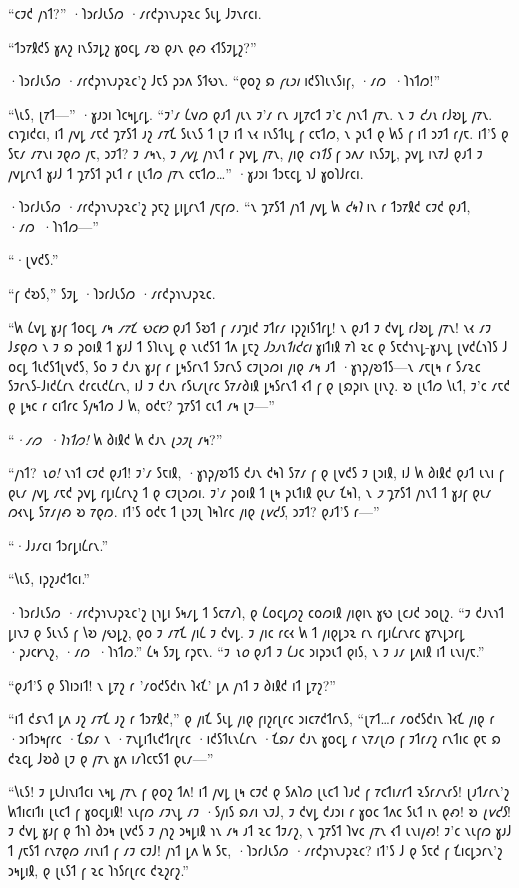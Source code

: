 “𐑤𐑲𐑒 𐑢𐑪𐑑?” ·𐑐𐑮𐑩𐑓𐑧𐑕𐑼 ·𐑥𐑩𐑒𐑜𐑪𐑯𐑨𐑜𐑷𐑤 𐑕𐑧𐑛 𐑓𐑲𐑯𐑩𐑤𐑦.

“𐑑𐑮𐑳𐑙𐑒𐑕 𐑣𐑵𐑟 𐑦𐑯𐑕𐑲𐑛𐑟 𐑣𐑴𐑤𐑛 𐑥𐑹 𐑞𐑨𐑯 𐑞𐑺 𐑬𐑑𐑕𐑲𐑛𐑟?”

·𐑐𐑮𐑩𐑓𐑧𐑕𐑼 ·𐑥𐑩𐑒𐑜𐑪𐑯𐑨𐑜𐑷𐑤'𐑟 𐑓𐑱𐑕 𐑜𐑮𐑵 𐑕𐑑𐑻𐑯. “𐑞𐑴𐑟 𐑸 \emph{𐑝𐑧𐑮𐑦} 𐑦𐑒𐑕𐑐𐑧𐑯𐑕𐑦𐑝, ·𐑥𐑼~·𐑐𐑪𐑑𐑼!”

“𐑘𐑧𐑕, 𐑚𐑳𐑑—” ·𐑣𐑨𐑮𐑦 𐑐𐑤𐑰𐑛𐑩𐑛. “𐑲'𐑥 𐑖𐑫𐑼 𐑞𐑨𐑑 𐑢𐑧𐑯 𐑲'𐑥 𐑩𐑯 𐑨𐑛𐑳𐑤𐑑 𐑲'𐑤 𐑢𐑪𐑯𐑑 𐑢𐑳𐑯. 𐑯 𐑲 \emph{𐑒𐑨𐑯} 𐑩𐑓𐑹𐑛 𐑢𐑳𐑯. 𐑤𐑪𐑡𐑦𐑒𐑤𐑦, 𐑦𐑑 𐑢𐑫𐑛 𐑥𐑱𐑒 𐑡𐑳𐑕𐑑 𐑨𐑟 𐑥𐑳𐑗 𐑕𐑧𐑯𐑕 𐑑 𐑚𐑲 𐑦𐑑 𐑯𐑬 𐑦𐑯𐑕𐑑𐑧𐑛 𐑝 𐑤𐑱𐑑𐑼, 𐑯 𐑜𐑧𐑑 𐑞 𐑿𐑕 𐑝 𐑦𐑑 𐑮𐑲𐑑 𐑩𐑢𐑱. 𐑦𐑑'𐑕 𐑞 𐑕𐑱𐑥 𐑥𐑳𐑯𐑦 𐑲𐑞𐑼 𐑢𐑱, 𐑮𐑲𐑑? 𐑲 𐑥𐑰𐑯, 𐑲 \emph{𐑢𐑫𐑛} 𐑢𐑪𐑯𐑑 𐑩 𐑜𐑫𐑛 𐑢𐑳𐑯, 𐑢𐑦𐑞 \emph{𐑤𐑪𐑑𐑕} 𐑝 𐑮𐑵𐑥 𐑦𐑯𐑕𐑲𐑛, 𐑜𐑫𐑛 𐑦𐑯𐑳𐑓 𐑞𐑨𐑑 𐑲 𐑢𐑫𐑛𐑩𐑯𐑑 𐑣𐑨𐑓 𐑑 𐑡𐑳𐑕𐑑 𐑜𐑧𐑑 𐑩 𐑚𐑧𐑑𐑼 𐑢𐑳𐑯 𐑤𐑱𐑑𐑼…” ·𐑣𐑨𐑮𐑦 𐑑𐑮𐑱𐑤𐑛 𐑪𐑓 𐑣𐑴𐑐𐑓𐑩𐑤𐑦.

·𐑐𐑮𐑩𐑓𐑧𐑕𐑼 ·𐑥𐑩𐑒𐑜𐑪𐑯𐑨𐑜𐑷𐑤'𐑟 𐑜𐑱𐑟 𐑛𐑦𐑛𐑩𐑯𐑑 𐑢𐑱𐑝𐑼. “𐑯 𐑡𐑳𐑕𐑑 𐑢𐑪𐑑 𐑢𐑫𐑛 𐑿 \emph{𐑒𐑰𐑐} 𐑦𐑯 𐑩 𐑑𐑮𐑳𐑙𐑒 𐑤𐑲𐑒 𐑞𐑨𐑑, ·𐑥𐑼~·𐑐𐑪𐑑𐑼—”

“·𐑚𐑫𐑒𐑕.”

“𐑝 𐑒𐑹𐑕,” 𐑕𐑲𐑛 ·𐑐𐑮𐑩𐑓𐑧𐑕𐑼 ·𐑥𐑩𐑒𐑜𐑪𐑯𐑨𐑜𐑷𐑤.

“𐑿 𐑖𐑫𐑛 𐑣𐑨𐑝 𐑑𐑴𐑤𐑛 𐑥𐑰 \emph{𐑥𐑳𐑗 𐑻𐑤𐑽} 𐑞𐑨𐑑 𐑕𐑹𐑑 𐑝 𐑥𐑨𐑡𐑦𐑒 𐑲𐑑𐑩𐑥 𐑦𐑜𐑟𐑦𐑕𐑑𐑩𐑛! 𐑯 𐑞𐑨𐑑 𐑲 𐑒𐑫𐑛 𐑩𐑓𐑹𐑛 𐑢𐑳𐑯! 𐑯𐑬 𐑥𐑲 𐑓𐑭𐑞𐑼 𐑯 𐑲 𐑸 𐑜𐑴𐑦𐑙 𐑑 𐑣𐑨𐑓 𐑑 𐑕𐑐𐑧𐑯𐑛 𐑞 𐑯𐑧𐑒𐑕𐑑 𐑑𐑵 𐑛𐑱𐑟 \emph{𐑓𐑮𐑨𐑯𐑑𐑦𐑒𐑤𐑦} 𐑣𐑦𐑑𐑦𐑙 𐑳𐑐 𐑷𐑤 𐑞 𐑕𐑱𐑒𐑪𐑯𐑛-𐑣𐑨𐑯𐑛 𐑚𐑫𐑒𐑖𐑪𐑐𐑕 𐑓 𐑴𐑤𐑛 𐑑𐑧𐑒𐑕𐑑𐑚𐑫𐑒𐑕, 𐑕𐑴 𐑲 𐑒𐑨𐑯 𐑣𐑨𐑝 𐑩 𐑛𐑰𐑕𐑩𐑯𐑑 𐑕𐑲𐑩𐑯𐑕 𐑤𐑲𐑚𐑮𐑼𐑦 𐑢𐑦𐑞 𐑥𐑰 𐑨𐑑 ·𐑣𐑪𐑜𐑢𐑹𐑑𐑕—𐑯 𐑥𐑱𐑚𐑰 𐑩 𐑕𐑥𐑷𐑤 𐑕𐑲𐑩𐑯𐑕-𐑓𐑦𐑒𐑖𐑩𐑯 𐑒𐑩𐑤𐑧𐑒𐑖𐑩𐑯, 𐑦𐑓 𐑲 𐑒𐑨𐑯 𐑩𐑕𐑧𐑥𐑚𐑩𐑤 𐑕𐑳𐑥𐑔𐑦𐑙 𐑛𐑰𐑕𐑩𐑯𐑑 𐑬𐑑 𐑝 𐑞 𐑚𐑸𐑜𐑦𐑯 𐑚𐑦𐑯𐑟. 𐑹 𐑚𐑧𐑑𐑼 𐑘𐑧𐑑, 𐑲'𐑤 𐑥𐑱𐑒 𐑞 𐑛𐑰𐑤 𐑩 𐑤𐑦𐑑𐑩𐑤 𐑕𐑢𐑰𐑑𐑼 𐑓 𐑿, 𐑴𐑒𐑱? 𐑡𐑳𐑕𐑑 𐑤𐑧𐑑 𐑥𐑰 𐑚𐑲—”

“\emph{·𐑥𐑼~·𐑐𐑪𐑑𐑼!} 𐑿 𐑔𐑦𐑙𐑒 𐑿 𐑒𐑨𐑯 \emph{𐑚𐑮𐑲𐑚} 𐑥𐑰?”

“𐑢𐑪𐑑? \emph{𐑯𐑴!} 𐑯𐑪𐑑 𐑤𐑲𐑒 𐑞𐑨𐑑! 𐑲'𐑥 𐑕𐑱𐑦𐑙, ·𐑣𐑪𐑜𐑢𐑹𐑑𐑕 𐑒𐑨𐑯 𐑒𐑰𐑐 𐑕𐑳𐑥 𐑝 𐑞 𐑚𐑫𐑒𐑕 𐑲 𐑚𐑮𐑦𐑙, 𐑦𐑓 𐑿 𐑔𐑦𐑙𐑒 𐑞𐑨𐑑 𐑧𐑯𐑦 𐑝 𐑞𐑧𐑥 𐑢𐑫𐑛 𐑥𐑱𐑒 𐑜𐑫𐑛 𐑩𐑛𐑦𐑖𐑩𐑯𐑟 𐑑 𐑞 𐑤𐑲𐑚𐑮𐑼𐑦. 𐑲'𐑥 𐑜𐑴𐑦𐑙 𐑑 𐑚𐑰 𐑜𐑧𐑑𐑦𐑙 𐑞𐑧𐑥 𐑗𐑰𐑐, 𐑯 \emph{𐑲} 𐑡𐑳𐑕𐑑 𐑢𐑪𐑯𐑑 𐑑 𐑣𐑨𐑝 𐑞𐑧𐑥 𐑼𐑬𐑯𐑛 𐑕𐑳𐑥𐑢𐑺 𐑹 𐑳𐑞𐑼. 𐑦𐑑'𐑕 𐑴𐑒𐑱 𐑑 𐑚𐑮𐑲𐑚 𐑐𐑰𐑐𐑩𐑤 𐑢𐑦𐑞 \emph{𐑚𐑫𐑒𐑕}, 𐑮𐑲𐑑? 𐑞𐑨𐑑'𐑕 𐑩—”

“·𐑓𐑨𐑥𐑤𐑦 𐑑𐑮𐑩𐑛𐑦𐑖𐑩𐑯.”

“𐑘𐑧𐑕, 𐑦𐑜𐑟𐑨𐑒𐑑𐑤𐑦.”

·𐑐𐑮𐑩𐑓𐑧𐑕𐑼 ·𐑥𐑩𐑒𐑜𐑪𐑯𐑨𐑜𐑷𐑤'𐑟 𐑚𐑪𐑛𐑦 𐑕𐑰𐑥𐑛 𐑑 𐑕𐑤𐑳𐑥𐑐, 𐑞 𐑖𐑴𐑤𐑛𐑼𐑟 𐑤𐑴𐑼𐑦𐑙 𐑢𐑦𐑞𐑦𐑯 𐑣𐑻 𐑚𐑤𐑨𐑒 𐑮𐑴𐑚𐑟. “𐑲 𐑒𐑨𐑯𐑪𐑑 𐑛𐑦𐑯𐑲 𐑞 𐑕𐑧𐑯𐑕 𐑝 𐑘𐑹 𐑢𐑻𐑛𐑟, 𐑞𐑴 𐑲 𐑥𐑳𐑗 𐑢𐑦𐑖 𐑲 𐑒𐑫𐑛. 𐑲 𐑢𐑦𐑤 𐑩𐑤𐑬 𐑿 𐑑 𐑢𐑦𐑞𐑛𐑮𐑷 𐑩𐑯 𐑩𐑛𐑦𐑖𐑩𐑯𐑩𐑤 𐑣𐑳𐑯𐑛𐑮𐑩𐑛 ·𐑜𐑨𐑤𐑾𐑯𐑟, ·𐑥𐑼~·𐑐𐑪𐑑𐑼.” 𐑖𐑰 𐑕𐑲𐑛 𐑩𐑜𐑱𐑯. “𐑲 \emph{𐑯𐑴} 𐑞𐑨𐑑 𐑲 𐑖𐑨𐑤 𐑮𐑦𐑜𐑮𐑧𐑑 𐑞𐑦𐑕, 𐑯 𐑲 𐑨𐑥 𐑛𐑵𐑦𐑙 𐑦𐑑 𐑧𐑯𐑦𐑢𐑱.”

“𐑞𐑨𐑑'𐑕 𐑞 𐑕𐑐𐑦𐑮𐑦𐑑! 𐑯 𐑛𐑳𐑟 𐑩 '𐑥𐑴𐑒𐑕𐑒𐑦𐑯 𐑐𐑬𐑗' 𐑛𐑵 𐑢𐑪𐑑 𐑲 𐑔𐑦𐑙𐑒 𐑦𐑑 𐑛𐑳𐑟?”

“𐑦𐑑 𐑒𐑭𐑯𐑑 𐑛𐑵 𐑨𐑟 𐑥𐑳𐑗 𐑨𐑟 𐑩 𐑑𐑮𐑳𐑙𐑒,” 𐑞 𐑢𐑦𐑗 𐑕𐑧𐑛 𐑢𐑦𐑞 𐑝𐑦𐑟𐑩𐑚𐑩𐑤 𐑮𐑦𐑤𐑳𐑒𐑑𐑩𐑯𐑕, “𐑚𐑳𐑑…𐑩 𐑥𐑴𐑒𐑕𐑒𐑦𐑯 𐑐𐑬𐑗 𐑢𐑦𐑞 𐑩 ·𐑮𐑦𐑑𐑮𐑰𐑝𐑩𐑤 ·𐑗𐑸𐑥 𐑯 ·𐑳𐑯𐑛𐑦𐑑𐑧𐑒𐑑𐑩𐑚𐑩𐑤 ·𐑦𐑒𐑕𐑑𐑧𐑯𐑖𐑩𐑯 ·𐑗𐑸𐑥 𐑒𐑨𐑯 𐑣𐑴𐑤𐑛 𐑩 𐑯𐑳𐑥𐑚𐑼 𐑝 𐑲𐑑𐑩𐑥𐑟 𐑩𐑯𐑑𐑦𐑤 𐑞𐑱 𐑸 𐑒𐑷𐑤𐑛 𐑓𐑹𐑔 𐑚𐑲 𐑞 𐑢𐑳𐑯 𐑣𐑵 𐑦𐑥𐑐𐑤𐑱𐑕𐑑 𐑞𐑧𐑥—”

“𐑘𐑧𐑕! 𐑲 𐑛𐑧𐑓𐑦𐑯𐑦𐑑𐑤𐑦 𐑯𐑰𐑛 𐑢𐑳𐑯 𐑝 𐑞𐑴𐑟 𐑑𐑵! 𐑦𐑑 𐑢𐑫𐑛 𐑚𐑰 𐑤𐑲𐑒 𐑞 𐑕𐑵𐑐𐑼 𐑚𐑧𐑤𐑑 𐑐𐑨𐑒 𐑝 𐑳𐑤𐑑𐑦𐑥𐑩𐑑 𐑷𐑕𐑩𐑥𐑯𐑩𐑕! 𐑚𐑨𐑑𐑥𐑩𐑯'𐑟 𐑿𐑑𐑦𐑤𐑦𐑑𐑦 𐑚𐑧𐑤𐑑 𐑝 𐑣𐑴𐑤𐑛𐑦𐑙! 𐑯𐑧𐑝𐑼 𐑥𐑲𐑯𐑛 𐑥𐑲 ·𐑕𐑢𐑦𐑕 𐑸𐑥𐑦 𐑯𐑲𐑓, 𐑲 𐑒𐑫𐑛 𐑒𐑨𐑮𐑦 𐑩 𐑣𐑴𐑤 𐑑𐑵𐑤 𐑕𐑧𐑑 𐑦𐑯 𐑞𐑺! 𐑹 \emph{𐑚𐑫𐑒𐑕}! 𐑲 𐑒𐑫𐑛 𐑣𐑨𐑝 𐑞 𐑑𐑪𐑐 𐑔𐑮𐑰 𐑚𐑫𐑒𐑕 𐑲 𐑢𐑪𐑟 𐑮𐑰𐑛𐑦𐑙 𐑪𐑯 𐑥𐑰 𐑨𐑑 𐑷𐑤 𐑑𐑲𐑥𐑟, 𐑯 𐑡𐑳𐑕𐑑 𐑐𐑫𐑤 𐑢𐑳𐑯 𐑬𐑑 𐑧𐑯𐑦𐑢𐑺! 𐑲'𐑤 𐑯𐑧𐑝𐑼 𐑣𐑨𐑓 𐑑 𐑢𐑱𐑕𐑑 𐑩𐑯𐑳𐑞𐑼 𐑥𐑦𐑯𐑦𐑑 𐑝 𐑥𐑲 𐑤𐑲𐑓! 𐑢𐑪𐑑 𐑛𐑵 𐑿 𐑕𐑱, ·𐑐𐑮𐑩𐑓𐑧𐑕𐑼 ·𐑥𐑩𐑒𐑜𐑪𐑯𐑨𐑜𐑷𐑤? 𐑦𐑑'𐑕 𐑓 𐑞 𐑕𐑱𐑒 𐑝 𐑗𐑦𐑤𐑛𐑮𐑩𐑯'𐑟 𐑮𐑰𐑛𐑦𐑙, 𐑞 𐑚𐑧𐑕𐑑 𐑝 𐑷𐑤 𐑐𐑪𐑕𐑩𐑚𐑩𐑤 𐑒𐑷𐑟𐑩𐑟.”

